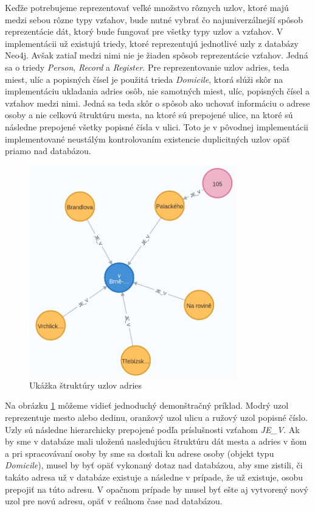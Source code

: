 Keďže potrebujeme reprezentovať veľké množstvo rôznych uzlov, ktoré majú medzi sebou rôzne typy vzťahov, bude nutné vybrať čo najuniverzálnejší spôsob reprezentácie dát, ktorý bude fungovať pre všetky typy uzlov a vzťahov. V implementácii už existujú triedy, ktoré reprezentujú jednotlivé uzly z databázy Neo4j. Avšak zatiaľ medzi nimi nie je žiaden spôsob reprezentácie vzťahov. Jedná sa o triedy \textit{Person}, \textit{Record} a \textit{Register}. Pre reprezentovanie uzlov adries, teda miest, ulíc a popisných čísel je použitá trieda \textit{Domicile}, ktorá slúži skôr na implementáciu ukladania adries osôb, nie samotných miest, ulíc, popisných čísel a vzťahov medzi nimi. Jedná sa teda skôr o spôsob ako uchovať informáciu o adrese osoby a nie celkovú štruktúru mesta, na ktoré sú prepojené ulice, na ktoré sú následne prepojené všetky popisné čísla v ulici. Toto je v pôvodnej implementácii implementované neustálým kontrolovaním existencie duplicitných uzlov opäť priamo nad databázou.

\begin{figure}[h]
    \centering
    \includegraphics[width=0.8\textwidth]{obrazky-figures/adresses.png}
    \caption{Ukážka štruktúry uzlov adries}
    \label{adress}
\end{figure}

Na obrázku \ref{adress} môžeme vidieť jednoduchý demonštračný príklad. Modrý uzol reprezentuje mesto alebo dedinu, oranžový uzol ulicu a ružový uzol popisné číslo. Uzly sú následne hierarchicky prepojené podľa príslušnosti vzťahom \textit{JE\_V}. Ak by sme v databáze mali uloženú nasledujúcu štruktúru dát mesta a adries v ňom a pri spracovávaní osoby by sme sa dostali ku adrese osoby (objekt typu \textit{Domicile}), musel by byť opäť vykonaný dotaz nad databázou, aby sme zistili, či takáto adresa už v databáze existuje a následne v prípade, že už existuje, osobu prepojiť na túto adresu. V opačnom prípade by musel byť ešte aj vytvorený nový uzol pre novú adresu, opäť v reálnom čase nad databázou.

